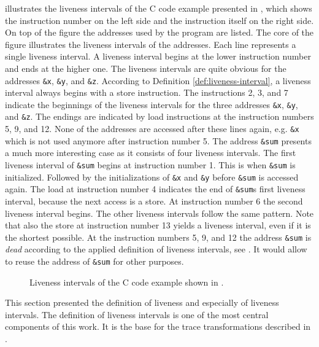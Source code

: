 \documentclass[onecolumn, openright, master, english, signatures]{dbrgrptt}
\begin{document}
 illustrates the liveness intervals of the C code example presented in , which shows the instruction number on the left side and the instruction itself on the right side.
On top of the figure the addresses used by the program are listed.
The core of the figure illustrates the liveness intervals of the addresses.
Each line represents a single liveness interval.
A liveness interval begins at the lower instruction number and ends at the higher one.
The liveness intervals are quite obvious for the addresses \texttt{\&x}, \texttt{\&y}, and \texttt{\&z}.
According to Definition \ref{def:liveness-interval}, a liveness interval always begins with a store instruction.
The instructions 2, 3, and 7 indicate the beginnings of the liveness intervals for the three addresses \texttt{\&x}, \texttt{\&y}, and \texttt{\&z}.
The endings are indicated by load instructions at the instruction numbers 5, 9, and 12.
None of the addresses are accessed after these lines again, e.g. \texttt{\&x} which is not used anymore after instruction number 5.
The address \texttt{\&sum} presents a much more interesting case as it consists of four liveness intervals.
The first liveness interval of \texttt{\&sum} begins at instruction number 1.
This is when \texttt{\&sum} is initialized.
Followed by the initializations of \texttt{\&x} and \texttt{\&y} before \texttt{\&sum} is accessed again.
The load at instruction number 4 indicates the end of \texttt{\&sum}s first liveness interval, because the next access is a store.
At instruction number 6 the second liveness interval begins.
The other liveness intervals follow the same pattern.
Note that also the store at instruction number 13 yields a liveness interval, even if it is the shortest possible.
At the instruction numbers 5, 9, and 12 the address \texttt{\&sum} is \emph{dead} according to the applied definition of liveness intervals, see .
It would allow to reuse the address of \texttt{\&sum} for other purposes.

\begin{figure}[!ht]
  \centering
  
  \caption{Liveness intervals of the C code example shown in .}
  \label{fig:liveness-intervals-example}
\end{figure}

This section presented the definition of liveness and especially of liveness intervals.
The definition of liveness intervals is one of the most central components of this work.
It is the base for the trace transformations described in .
\end{document}
